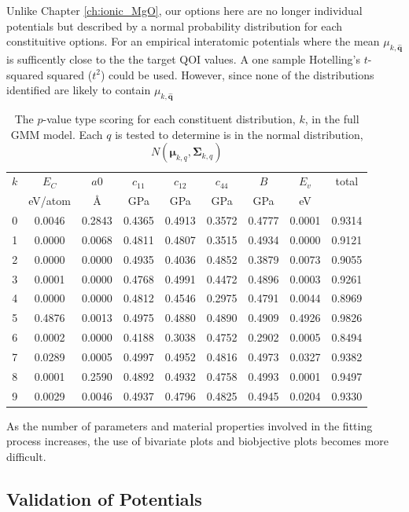 Unlike Chapter \ref{ch:ionic_MgO}, our options here are no longer individual potentials but described by a normal probability distribution for each constituitive options.  For an empirical interatomic potentials where the mean $\mu_{k,\hat{\bm{q}}}$ is sufficently close to the the target QOI values.  A one sample Hotelling's $t$-squared squared ($t^2$) could be used.  However, since none of the distributions identified are likely to contain $\mu_{k,\hat{\bm{q}}}$
\begin{table}[ht]
	\centering
	\caption{The $p$-value type scoring for each constituent distribution, $k$, in the full GMM model. Each $q$ is tested to determine is in the normal distribution, $N(\bm{\mu}_{k,q}, \bm{\Sigma}_{k,q})$}
	\label{tbl:sw_all_gmm_qois}
	\begin{tabular}{ccccccccc}
		\hline
		$k$ & $E_C$ & $a0$ & $c_{11}$ & $c_{12}$ & $c_{44}$ & $B$ & $E_v$ & total \\
		    & eV/atom & \AA & GPa & GPa & GPa & GPa & eV & \\
		\hline
		0 & 0.0046 & 0.2843 & 0.4365 & 0.4913 & 0.3572 & 0.4777 & 0.0001 & 0.9314\\
		1 & 0.0000 & 0.0068 & 0.4811 & 0.4807 & 0.3515 & 0.4934 & 0.0000 & 0.9121\\
		2 & 0.0000 & 0.0000 & 0.4935 & 0.4036 & 0.4852 & 0.3879 & 0.0073 & 0.9055\\
		3 & 0.0001 & 0.0000 & 0.4768 & 0.4991 & 0.4472 & 0.4896 & 0.0003 & 0.9261\\
		4 & 0.0000 & 0.0000 & 0.4812 & 0.4546 & 0.2975 & 0.4791 & 0.0044 & 0.8969\\
		5 & 0.4876 & 0.0013 & 0.4975 & 0.4880 & 0.4890 & 0.4909 & 0.4926 & 0.9826\\
		6 & 0.0002 & 0.0000 & 0.4188 & 0.3038 & 0.4752 & 0.2902 & 0.0005 & 0.8494\\
		7 & 0.0289 & 0.0005 & 0.4997 & 0.4952 & 0.4816 & 0.4973 & 0.0327 & 0.9382\\
		8 & 0.0001 & 0.2590 & 0.4892 & 0.4932 & 0.4758 & 0.4993 & 0.0001 & 0.9497\\
		9 & 0.0029 & 0.0046 & 0.4937 & 0.4796 & 0.4825 & 0.4945 & 0.0204 & 0.9330\\
		\hline
	\end{tabular}
\end{table}






As the number of parameters and material properties involved in the fitting process increases, the use of bivariate plots and biobjective plots becomes more difficult.


\subsection{Validation of Potentials}
